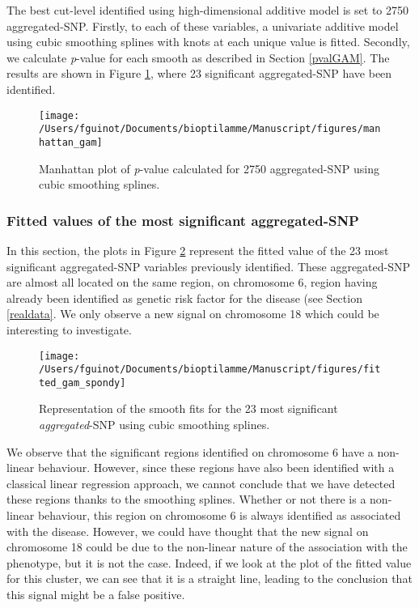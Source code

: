 \documentclass[]{book}
\begin{document}
The best cut-level identified using high-dimensional additive model is
set to 2750 aggregated-SNP. Firstly, to each of these variables, a
univariate additive model using cubic smoothing splines with knots at
each unique value is fitted. Secondly, we calculate \emph{p}-value for each
smooth as described in Section \ref{pvalGAM}. The results are shown
in Figure \ref{fig:manhattangam}, where 23 significant aggregated-SNP
have been identified.



\begin{figure}

{\centering \texttt{[image: /Users/fguinot/Documents/bioptilamme/Manuscript/figures/manhattan\_gam]} 

}

\caption{Manhattan plot of \emph{p}-value calculated for 2750 aggregated-SNP using cubic smoothing splines.}\label{fig:manhattangam}
\end{figure}

\hypertarget{fitted-values-of-the-most-significant-aggregated-snp}{%
\subsubsection{Fitted values of the most significant aggregated-SNP}\label{fitted-values-of-the-most-significant-aggregated-snp}}

In this section, the plots in Figure \ref{fig:fittedgamspondy}
represent the fitted value of the 23 most significant aggregated-SNP
variables previously identified. These aggregated-SNP are almost all
located on the same region, on chromosome 6, region having already been
identified as genetic risk factor for the disease (see Section
\ref{realdata}. We only observe a new signal on chromosome 18
which could be interesting to investigate.



\begin{figure}

{\centering \texttt{[image: /Users/fguinot/Documents/bioptilamme/Manuscript/figures/fitted\_gam\_spondy]} 

}

\caption{Representation of the smooth fits for the 23 most significant \emph{aggregated}-SNP using cubic smoothing splines.}\label{fig:fittedgamspondy}
\end{figure}

We observe that the significant regions identified on chromosome 6 have
a non-linear behaviour. However, since these regions have also been
identified with a classical linear regression approach, we cannot
conclude that we have detected these regions thanks to the smoothing
splines. Whether or not there is a non-linear behaviour, this region on
chromosome 6 is always identified as associated with the disease.
However, we could have thought that the new signal on chromosome 18
could be due to the non-linear nature of the association with the
phenotype, but it is not the case. Indeed, if we look at the plot of the
fitted value for this cluster, we can see that it is a straight line,
leading to the conclusion that this signal might be a false positive.
\end{document}
